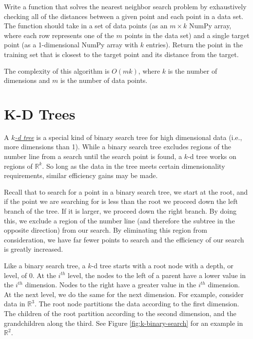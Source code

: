 \begin{problem} %
Write a function that solves the nearest neighbor search problem by exhaustively checking all of the distances between a given point and each point in a data set.
The function should take in a set of data points (as an $m \times k$ NumPy array, where each row represents one of the $m$ points in the data set) and a single target point (as a 1-dimensional NumPy array with $k$ entries).
Return the point in the training set that is closest to the target point and its distance from the target.

The complexity of this algorithm is $O(mk)$, where $k$ is the number of dimensions and $m$ is the number of data points.
\end{problem}

\section*{K-D Trees} %

A \href{https://en.wikipedia.org/wiki/K-d_tree}{\emph{$k$-d tree}} is a special kind of binary search tree for high dimensional data (i.e., more dimensions than 1).
While a binary search tree excludes regions of the number line from a search until the search point is found, a $k$-d tree works on regions of $\mathbb{R}^k$.
So long as the data in the tree meets certain dimensionality requirements, similar efficiency gains may be made.

Recall that to search for a point in a binary search tree, we start at the root, and if the point we are searching for is less than the root we proceed down the left branch of the tree.
If it is larger, we proceed down the right branch.
By doing this, we exclude a region of the number line (and therefore the subtree in the opposite direction) from our search.
By eliminating this region from consideration, we have far fewer points to search and the efficiency of our search is greatly increased.

Like a binary search tree, a $k$-d tree starts with a root node with a depth, or level, of 0.
At the $i^{th}$ level, the nodes to the left of a parent have a lower value in the $i^{th}$ dimension.
Nodes to the right have a greater value in the $i^{th}$ dimension.
At the next level, we do the same for the next dimension.
For example, consider data in $\mathbb{R}^3$.
The root node partitions the data according to the first dimension.
The children of the root partition according to the second dimension, and the grandchildren along the third.
See Figure \ref{fig:k-binary-search} for an example in $\mathbb{R}^2$.


